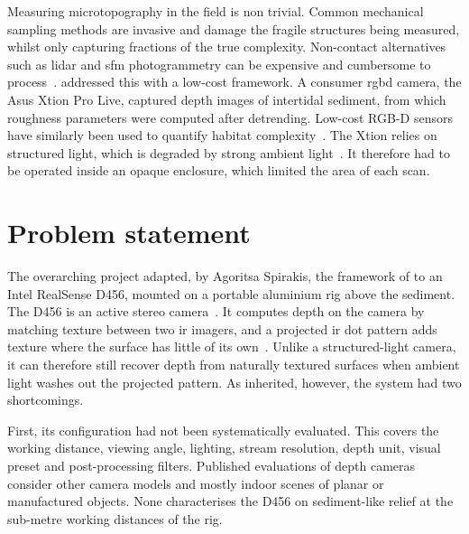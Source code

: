 Measuring microtopography in the field is non trivial. Common mechanical sampling methods are invasive and damage the fragile structures being measured, whilst only capturing fractions of the true complexity. Non-contact alternatives such as \gls{lidar} and \gls{sfm} photogrammetry can be expensive and cumbersome to process~\citep{azharRGBDFrameworkCapturing2022}. \citet{azharRGBDFrameworkCapturing2022} addressed this with a low-cost framework. A consumer \gls{rgbd} camera, the Asus Xtion Pro Live, captured depth images of intertidal sediment, from which roughness parameters were computed after \gls{detrending}. Low-cost RGB-D sensors have similarly been used to quantify habitat complexity~\citep{kamalInvestigatingThreedimensionalMesoscale2014}. The Xtion relies on structured light, which is degraded by strong ambient light~\citep{halmetschlager-funekEmpiricalEvaluationTen2019}. It therefore had to be operated inside an opaque enclosure, which limited the area of each scan.

\section{Problem statement}
\label{sec:ch1.problemstatement}
The overarching project adapted, by Agoritsa Spirakis, the framework of \citet{azharRGBDFrameworkCapturing2022} to an Intel RealSense D456, mounted on a portable aluminium rig above the sediment. The D456 is an active stereo camera~\citep{intel_d456}. It computes depth on the camera by matching texture between two \gls{ir} imagers, and a projected \gls{ir} dot pattern adds texture where the surface has little of its own~\citep{keselmanIntelRRealSenseTMStereoscopic2017, ProjectorsD400Series}. Unlike a structured-light camera, it can therefore still recover depth from naturally textured surfaces when ambient light washes out the projected pattern. As inherited, however, the system had two shortcomings.

First, its configuration had not been systematically evaluated. This covers the working distance, viewing angle, lighting, stream resolution, depth unit, visual preset and post-processing filters. Published evaluations of depth cameras~\citep{carfagniMetrologicalCriticalCharacterization2019, halmetschlager-funekEmpiricalEvaluationTen2019, rustlerEmpiricalComparisonFour2025} consider other camera models and mostly indoor scenes of planar or manufactured objects. None characterises the D456 on sediment-like relief at the sub-metre working distances of the rig.

